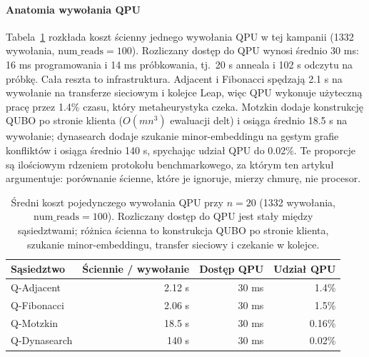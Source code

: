 \documentclass[11pt,a4paper]{article}
\begin{document}
\paragraph{Anatomia wywołania QPU}
Tabela~\ref{tab:qpu_anatomy} rozkłada koszt ścienny jednego wywołania
QPU w tej kampanii (1332 wywołania, $\mathrm{num\_reads}=100$).
Rozliczany dostęp do QPU wynosi średnio 30 ms: 16 ms programowania
i 14 ms próbkowania, tj.\ 20 \textmu s anneala i 102 \textmu s odczytu
na próbkę. Cała reszta to infrastruktura. Adjacent i Fibonacci
spędzają 2.1 s na wywołanie na transferze sieciowym i kolejce Leap,
więc QPU wykonuje użyteczną pracę przez 1.4\% czasu, który
metaheurystyka czeka. Motzkin dodaje konstrukcję QUBO po stronie
klienta ($O(mn^3)$ ewaluacji delt) i osiąga średnio 18.5 s na
wywołanie; dynasearch dodaje szukanie minor-embeddingu na gęstym
grafie konfliktów i osiąga średnio 140 s, spychając udział QPU do
0.02\%. Te proporcje są ilościowym rdzeniem protokołu benchmarkowego,
za którym ten artykuł argumentuje: porównanie ścienne, które je
ignoruje, mierzy chmurę, nie procesor.

\begin{table}[h]
\centering
\caption{Średni koszt pojedynczego wywołania QPU przy $n=20$ (1332
  wywołania, $\mathrm{num\_reads}=100$). Rozliczany dostęp do QPU
  jest stały między sąsiedztwami; różnica ścienna to konstrukcja QUBO
  po stronie klienta, szukanie minor-embeddingu, transfer sieciowy
  i czekanie w kolejce.}
\label{tab:qpu_anatomy}
\begin{tabular}{@{}lrrr@{}}
\toprule
Sąsiedztwo & Ściennie / wywołanie & Dostęp QPU & Udział QPU \\
\midrule
Q-Adjacent   & 2.12 s & 30 ms & 1.4\% \\
Q-Fibonacci  & 2.06 s & 30 ms & 1.5\% \\
Q-Motzkin    & 18.5 s & 30 ms & 0.16\% \\
Q-Dynasearch & 140 s  & 30 ms & 0.02\% \\
\bottomrule
\end{tabular}
\end{table}
\end{document}
